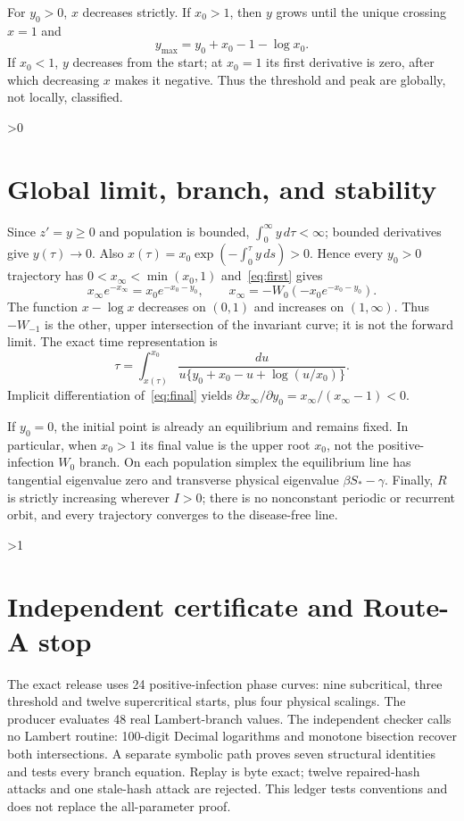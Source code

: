 \documentclass[9pt]{extarticle}
\begin{document}
For $y_0>0$, $x$ decreases strictly.  If $x_0>1$, then $y$ grows until the
unique crossing $x=1$ and
\[
 y_{\max}=y_0+x_0-1-\log x_0.
\]
If $x_0<1$, $y$ decreases from the start; at $x_0=1$ its first derivative is
zero, after which decreasing $x$ makes it negative.  Thus the threshold and
peak are globally, not locally, classified.

\ifnum\CRevisionRound>0
\section{Global limit, branch, and stability}
Since $z'=y\ge0$ and population is bounded, $\int_0^\infty y\,d\tau<\infty$;
bounded derivatives give $y(\tau)\to0$.  Also
$x(\tau)=x_0\exp(-\int_0^\tau y\,ds)>0$.  Hence every $y_0>0$ trajectory has
$0<x_\infty<\min(x_0,1)$ and~\eqref{eq:first} gives
\begin{equation}\label{eq:final}
 x_\infty e^{-x_\infty}=x_0e^{-x_0-y_0},\qquad
 x_\infty=-W_0(-x_0e^{-x_0-y_0}).
\end{equation}
The function $x-\log x$ decreases on $(0,1)$ and increases on $(1,\infty)$.
Thus $-W_{-1}$ is the other, upper intersection of the invariant curve; it is
not the forward limit.  The exact time representation is
\[
 \tau=\int_{x(\tau)}^{x_0}
 \frac{du}{u\{y_0+x_0-u+\log(u/x_0)\}}.
\]
Implicit differentiation of~\eqref{eq:final} yields
$\partial x_\infty/\partial y_0=x_\infty/(x_\infty-1)<0$.

If $y_0=0$, the initial point is already an equilibrium and remains fixed.
In particular, when $x_0>1$ its final value is the upper root $x_0$, not the
positive-infection $W_0$ branch.  On each population simplex the equilibrium
line has tangential eigenvalue zero and transverse physical eigenvalue
$\beta S_\ast-\gamma$.  Finally, $R$ is strictly increasing wherever $I>0$;
there is no nonconstant periodic or recurrent orbit, and every trajectory
converges to the disease-free line.
\fi

\ifnum\CRevisionRound>1
\section{Independent certificate and Route-A stop}
The exact release uses 24 positive-infection phase curves: nine subcritical,
three threshold and twelve supercritical starts, plus four physical scalings.
The producer evaluates 48 real Lambert-branch values.  The independent checker
calls no Lambert routine: 100-digit Decimal logarithms and monotone bisection
recover both intersections.  A separate symbolic path proves seven structural
identities and tests every branch equation.  Replay is byte exact; twelve
repaired-hash attacks and one stale-hash attack are rejected.  This ledger
tests conventions and does not replace the all-parameter proof.
\end{document}
